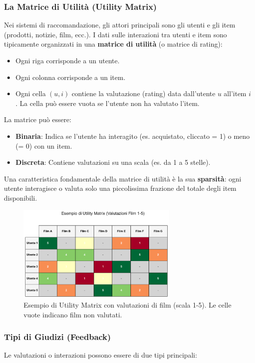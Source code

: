 \documentclass{article}
\begin{document}
\subsubsection{La Matrice di Utilità (Utility Matrix)}
Nei sistemi di raccomandazione, gli attori principali sono gli utenti e gli item (prodotti, notizie, film, ecc.). I dati sulle interazioni tra utenti e item sono tipicamente organizzati in una \textbf{matrice di utilità} (o matrice di rating):
\begin{itemize}
    \item Ogni riga corrisponde a un utente.
    \item Ogni colonna corrisponde a un item.
    \item Ogni cella $(u, i)$ contiene la valutazione (rating) data dall'utente $u$ all'item $i$. La cella può essere vuota se l'utente non ha valutato l'item.
\end{itemize}
La matrice può essere:
\begin{itemize}
    \item \textbf{Binaria}: Indica se l'utente ha interagito (es. acquistato, cliccato = 1) o meno (= 0) con un item.
    \item \textbf{Discreta}: Contiene valutazioni su una scala (es. da 1 a 5 stelle).
\end{itemize}
Una caratteristica fondamentale della matrice di utilità è la sua \textbf{sparsità}: ogni utente interagisce o valuta solo una piccolissima frazione del totale degli item disponibili.

\begin{figure}[H]
    \centering
    \includegraphics[width=0.7\textwidth]{images/utility_matrix_example.pdf}
    \caption{Esempio di Utility Matrix con valutazioni di film (scala 1-5). Le celle vuote indicano film non valutati.}
    \label{fig:utility_matrix_example}
\end{figure}

\subsubsection{Tipi di Giudizi (Feedback)}
Le valutazioni o interazioni possono essere di due tipi principali:
\end{document}
